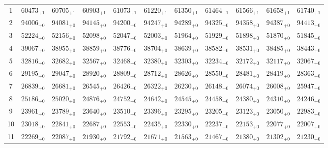 \documentclass[10pt, a4paper]{article}
\begin{document}
\begin{center}
\begin{tabular}{c || c c c c c | c c c c c}
        1 & \({60473}_{+1}\) & \({60705}_{+1}\) & \({60903}_{+1}\) & \({61073}_{+1}\) & \({61220}_{+1}\) & \({61350}_{+1}\) & \({61464}_{+1}\) & \({61566}_{+1}\) & \({61658}_{+1}\) & \({61740}_{+1}\)\\
        2 & \({94006}_{+0}\) & \({94081}_{+0}\) & \({94145}_{+0}\) & \({94200}_{+0}\) & \({94247}_{+0}\) & \({94289}_{+0}\) & \({94325}_{+0}\) & \({94358}_{+0}\) & \({94387}_{+0}\) & \({94413}_{+0}\)\\
        3 & \({52224}_{+0}\) & \({52156}_{+0}\) & \({52098}_{+0}\) & \({52047}_{+0}\) & \({52003}_{+0}\) & \({51964}_{+0}\) & \({51929}_{+0}\) & \({51898}_{+0}\) & \({51870}_{+0}\) & \({51845}_{+0}\)\\
        4 & \({39067}_{+0}\) & \({38955}_{+0}\) & \({38859}_{+0}\) & \({38776}_{+0}\) & \({38704}_{+0}\) & \({38639}_{+0}\) & \({38582}_{+0}\) & \({38531}_{+0}\) & \({38485}_{+0}\) & \({38443}_{+0}\)\\
        5 & \({32816}_{+0}\) & \({32682}_{+0}\) & \({32567}_{+0}\) & \({32468}_{+0}\) & \({32380}_{+0}\) & \({32303}_{+0}\) & \({32234}_{+0}\) & \({32172}_{+0}\) & \({32117}_{+0}\) & \({32067}_{+0}\)\\
        \hline
        6 & \({29195}_{+0}\) & \({29047}_{+0}\) & \({28920}_{+0}\) & \({28809}_{+0}\) & \({28712}_{+0}\) & \({28626}_{+0}\) & \({28550}_{+0}\) & \({28481}_{+0}\) & \({28419}_{+0}\) & \({28363}_{+0}\)\\
        7 & \({26839}_{+0}\) & \({26681}_{+0}\) & \({26545}_{+0}\) & \({26426}_{+0}\) & \({26322}_{+0}\) & \({26230}_{+0}\) & \({26148}_{+0}\) & \({26074}_{+0}\) & \({26008}_{+0}\) & \({25947}_{+0}\)\\
        8 & \({25186}_{+0}\) & \({25020}_{+0}\) & \({24876}_{+0}\) & \({24752}_{+0}\) & \({24642}_{+0}\) & \({24545}_{+0}\) & \({24458}_{+0}\) & \({24380}_{+0}\) & \({24310}_{+0}\) & \({24246}_{+0}\)\\
        9 & \({23961}_{+0}\) & \({23789}_{+0}\) & \({23640}_{+0}\) & \({23510}_{+0}\) & \({23396}_{+0}\) & \({23295}_{+0}\) & \({23205}_{+0}\) & \({23123}_{+0}\) & \({23050}_{+0}\) & \({22983}_{+0}\)\\
        10 & \({23018}_{+0}\) & \({22841}_{+0}\) & \({22687}_{+0}\) & \({22553}_{+0}\) & \({22435}_{+0}\) & \({22330}_{+0}\) & \({22237}_{+0}\) & \({22153}_{+0}\) & \({22077}_{+0}\) & \({22007}_{+0}\)\\
        \hline
        11 & \({22269}_{+0}\) & \({22087}_{+0}\) & \({21930}_{+0}\) & \({21792}_{+0}\) & \({21671}_{+0}\) & \({21563}_{+0}\) & \({21467}_{+0}\) & \({21380}_{+0}\) & \({21302}_{+0}\) & \({21230}_{+0}\)\\

\end{tabular}
\end{center}
\end{document}
